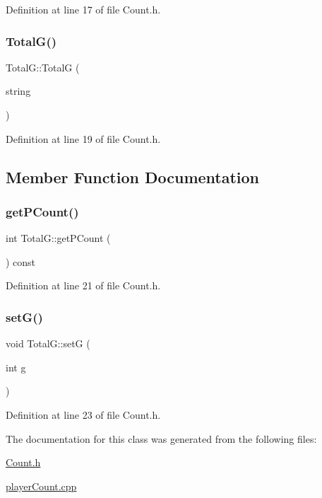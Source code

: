 Definition at line 17 of file Count.\+h.

\hypertarget{class_total_g_ad30697833300327ec296534142355f3e}{}\label{class_total_g_ad30697833300327ec296534142355f3e} 
\subsubsection{\texorpdfstring{Total\+G()}{TotalG()}\hspace{0.1cm}{\footnotesize\ttfamily [2/2]}}
{\footnotesize\ttfamily Total\+G\+::\+TotalG (\begin{DoxyParamCaption}\item[{string}]{ }\end{DoxyParamCaption})\hspace{0.3cm}{\ttfamily [inline]}}



Definition at line 19 of file Count.\+h.



\subsection{Member Function Documentation}
\hypertarget{class_total_g_ad41569165fe712f2b16f8c1fa52ed6fc}{}\label{class_total_g_ad41569165fe712f2b16f8c1fa52ed6fc} 
\subsubsection{\texorpdfstring{get\+P\+Count()}{getPCount()}}
{\footnotesize\ttfamily int Total\+G\+::get\+P\+Count (\begin{DoxyParamCaption}{ }\end{DoxyParamCaption}) const\hspace{0.3cm}{\ttfamily [inline]}}



Definition at line 21 of file Count.\+h.

\hypertarget{class_total_g_ae03634e9b4b363cad288aa79979b2f90}{}\label{class_total_g_ae03634e9b4b363cad288aa79979b2f90} 
\subsubsection{\texorpdfstring{set\+G()}{setG()}}
{\footnotesize\ttfamily void Total\+G\+::setG (\begin{DoxyParamCaption}\item[{int}]{g }\end{DoxyParamCaption})\hspace{0.3cm}{\ttfamily [inline]}}



Definition at line 23 of file Count.\+h.



The documentation for this class was generated from the following files\+:\begin{DoxyCompactItemize}
\item 
\hyperlink{_count_8h}{Count.\+h}\item 
\hyperlink{player_count_8cpp}{player\+Count.\+cpp}\end{DoxyCompactItemize}
